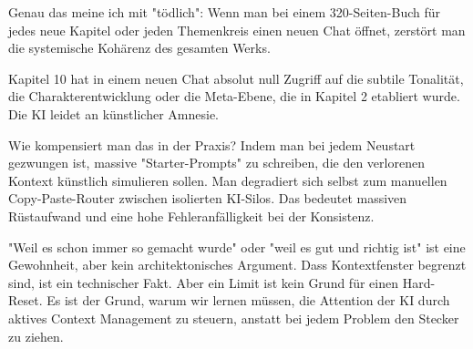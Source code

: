 Genau das meine ich mit "tödlich": Wenn man bei einem 320-Seiten-Buch für jedes neue Kapitel oder jeden Themenkreis einen neuen Chat öffnet, zerstört man die systemische Kohärenz des gesamten Werks.

Kapitel 10 hat in einem neuen Chat absolut null Zugriff auf die subtile Tonalität, die Charakterentwicklung oder die Meta-Ebene, die in Kapitel 2 etabliert wurde. Die KI leidet an künstlicher Amnesie.

Wie kompensiert man das in der Praxis? Indem man bei jedem Neustart gezwungen ist, massive "Starter-Prompts" zu schreiben, die den verlorenen Kontext künstlich simulieren sollen. Man degradiert sich selbst zum manuellen Copy-Paste-Router zwischen isolierten KI-Silos. Das bedeutet massiven Rüstaufwand und eine hohe Fehleranfälligkeit bei der Konsistenz.

"Weil es schon immer so gemacht wurde" oder "weil es gut und richtig ist" ist eine Gewohnheit, aber kein architektonisches Argument. Dass Kontextfenster begrenzt sind, ist ein technischer Fakt. Aber ein Limit ist kein Grund für einen Hard-Reset. Es ist der Grund, warum wir lernen müssen, die Attention der KI durch aktives Context Management zu steuern, anstatt bei jedem Problem den Stecker zu ziehen.